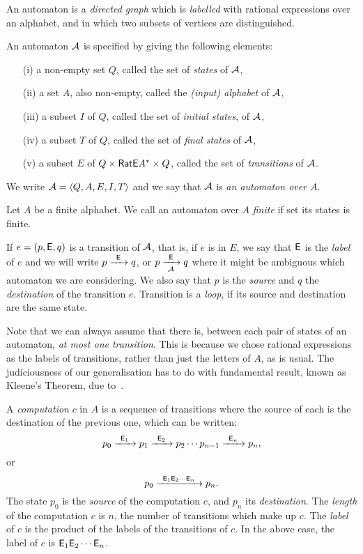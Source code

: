 An automaton is a \emph{directed graph} which is \emph{labelled} with rational expressions over an alphabet, and in which two subsets of vertices are distinguished.

\begin{defn}
    An automaton ${\mathcal{A}}$ is specified by giving the following elements:
    \begin{itemize}
        \item[(i)] a non-empty set $Q$, called the set of \emph{states} of ${\mathcal{A}}$,
        \item[(ii)] a set $A$, also non-empty, called the \emph{(input) alphabet} of ${\mathcal{A}}$,
        \item[(iii)] a subset $I$ of $Q$, called the set of \emph{initial states}, of ${\mathcal{A}}$,
        \item[(iv)] a subset $T$ of $Q$, called the set of \emph{final states} of ${\mathcal{A}}$,
        \item[(v)] a subset $E$ of $Q \times {\mathsf{RatE}} A^* \times Q$, called the set of \emph{transitions} of ${\mathcal{A}}$.
    \end{itemize}
    We write ${\mathcal{A}} = \langle Q, A, E, I, T \rangle$ and we say that ${\mathcal{A}}$ is \emph{an automaton over $A$}.
\end{defn}

Let $A$ be a finite alphabet. We call an automaton over $A$ \emph{finite} if set its states is finite.

If $e = (p, {\mathsf{E}}, q)$ is a transition of ${\mathcal{A}}$, that is, if $e$ is in $E$, we say that ${\mathsf{E}}$ is the \emph{label} of $e$ and we will write $p {\; \xrightarrow[]{\: \; {\mathsf{E}} \: \;} \;} q$, or $p {\; \xrightarrow[{\mathcal{A}}]{\: \; {\mathsf{E}} \: \;} \;} q$ where it might be ambiguous which automaton we are considering. We also say that $p$ is the \emph{source} and $q$ the \emph{destination} of the transition $e$. Transition is a \emph{loop}, if its source and destination are the same state.

Note that we can always assume that there is, between each pair of states of an automaton, \emph{at most one transition}. This is because we chose rational expressions as the labels of transitions, rather than just the letters of $A$, as is usual. The judiciousness of our generalisation has to do with fundamental result, known as Kleene’s Theorem, due to~\cite{Kleene56}.

A \emph{computation} $c$ in $A$ is a sequence of transitions where the source of each is the destination of the previous one, which can be written:
\[
    p_0 {\; \xrightarrow[]{\: \; {\mathsf{E}}_1 \: \;} \;} p_1 {\; \xrightarrow[]{\: \; {\mathsf{E}}_2 \: \;} \;} p_2 \dotsm p_{n-1} {\; \xrightarrow[]{\: \; {\mathsf{E}}_n \: \;} \;} p_n,
\]
or
\[
    p_0 {\; \xrightarrow[]{\: \; {\mathsf{E}}_1 {\mathsf{E}}_2 \dotsm {\mathsf{E}}_n \: \;} \;} p_n.
\]
The state $p_0$ is the \emph{source} of the computation $c$, and $p_n$ its \emph{destination}. The \emph{length} of the computation $c$ is $n$, the number of transitions which make up $c$. The \emph{label} of $c$ is the product of the labels of the transitions of $c$. In the above case, the label of $c$ is ${\mathsf{E}}_1 {\mathsf{E}}_2 \dotsm {\mathsf{E}}_n$.

